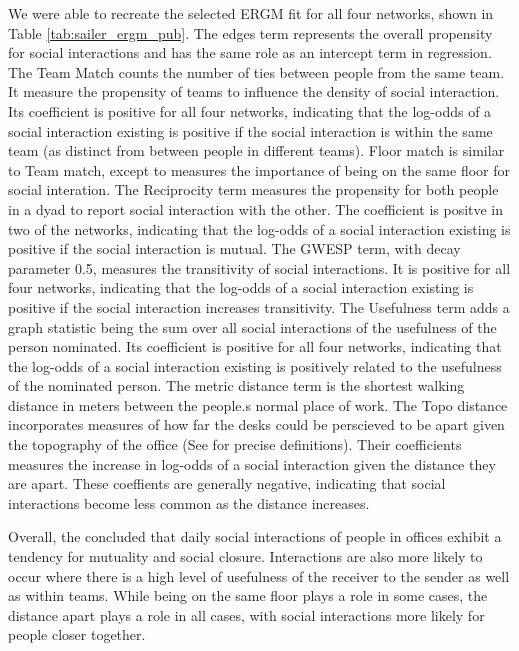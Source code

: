 \documentclass[
]{statsoc}
\begin{document}
We were able to recreate the selected ERGM fit for all four networks,
shown in Table \ref{tab:sailer_ergm_pub}. The edges term represents the
overall propensity for social interactions and has the same role as an
intercept term in regression. The Team Match counts the number of ties
between people from the same team. It measure the propensity of teams to
influence the density of social interaction. Its coefficient is positive
for all four networks, indicating that the log-odds of a social
interaction existing is positive if the social interaction is within the
same team (as distinct from between people in different teams). Floor
match is similar to Team match, except to measures the importance of
being on the same floor for social interation. The Reciprocity term
measures the propensity for both people in a dyad to report social
interaction with the other. The coefficient is positve in two of the
networks, indicating that the log-odds of a social interaction existing
is positive if the social interaction is mutual. The GWESP term, with
decay parameter 0.5, measures the transitivity of social interactions.
It is positive for all four networks, indicating that the log-odds of a
social interaction existing is positive if the social interaction
increases transitivity. The Usefulness term adds a graph statistic being
the sum over all social interactions of the usefulness of the person
nominated. Its coefficient is positive for all four networks, indicating
that the log-odds of a social interaction existing is positively related
to the usefulness of the nominated person. The metric distance term is
the shortest walking distance in meters between the people.s normal
place of work. The Topo distance incorporates measures of how far the
desks could be perscieved to be apart given the topography of the office
(See \cite{Sailer2012} for precise definitions). Their coefficients
measures the increase in log-odds of a social interaction given the
distance they are apart. These coeffients are generally negative,
indicating that social interactions become less common as the distance
increases.

Overall, the \cite{Sailer2012} concluded that daily social interactions
of people in offices exhibit a tendency for mutuality and social
closure. Interactions are also more likely to occur where there is a
high level of usefulness of the receiver to the sender as well as within
teams. While being on the same floor plays a role in some cases, the
distance apart plays a role in all cases, with social interactions more
likely for people closer together.
\end{document}
